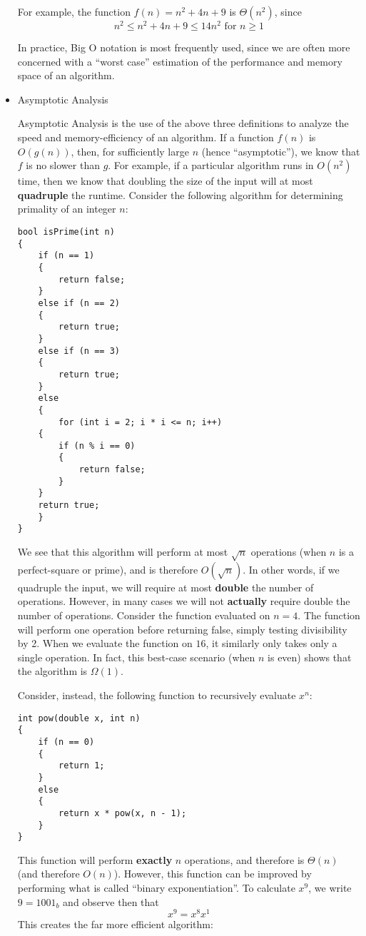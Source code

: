 \documentclass[a4paper]{article}
\begin{document}
\begin{itemize}
For example, the function $f(n)=n^2+4n+9$ is $\Theta(n^2)$, since \[n^2 \leq n^2+4n+9\leq14n^2\text{ for } n\geq1\]

In practice, Big O notation is most frequently used, since we are often more concerned with a ``worst case'' estimation of the performance and memory space of an algorithm.

\item Asymptotic Analysis

Asymptotic Analysis is the use of the above three definitions to analyze the speed and memory-efficiency of an algorithm. If a function $f(n)$ is $O(g(n))$, then, for sufficiently large $n$ (hence ``asymptotic''), we know that $f$ is no slower than $g$. For example, if a particular algorithm runs in $O(n^2)$ time, then we know that doubling the size of the input will at most \textbf{quadruple} the runtime. Consider the following algorithm for determining primality of an integer $n$:

\begin{verbatim}
bool isPrime(int n)
{
    if (n == 1)
    {
        return false;
    }
    else if (n == 2)
    {
        return true;
    }
    else if (n == 3)
    {
        return true;
    }
    else
    {
        for (int i = 2; i * i <= n; i++)
    {
        if (n % i == 0)
        {
            return false;
        }
    }
    return true;
    }
}
\end{verbatim}

We see that this algorithm will perform at most $\sqrt{n}$ operations (when $n$ is a perfect-square or prime), and is therefore $O(\sqrt{n})$. In other words, if we quadruple the input, we will require at most \textbf{double} the number of operations. However, in many cases we will not \textbf{actually} require double the number of operations. Consider the function evaluated on $n=4$. The function will perform one operation before returning false, simply testing divisibility by 2. When we evaluate the function on $16$, it similarly only takes only a single operation. In fact, this best-case scenario (when $n$ is even) shows that the algorithm is $\Omega(1)$. 

Consider, instead, the following function to recursively evaluate $x^n$:
\begin{verbatim}
int pow(double x, int n)
{
	if (n == 0)
	{
		return 1;
	}
	else
    {
		return x * pow(x, n - 1);
    }
}
\end{verbatim}

This function will perform \textbf{exactly} $n$ operations, and therefore is $\Theta(n)$ (and therefore $O(n)$). However, this function can be improved by performing what is called ``binary exponentiation''. To calculate $x^9$, we write $9=1001_b$ and observe then that\[x^9=x^8x^1\] This creates the far more efficient algorithm:


\end{itemize}
\end{document}
